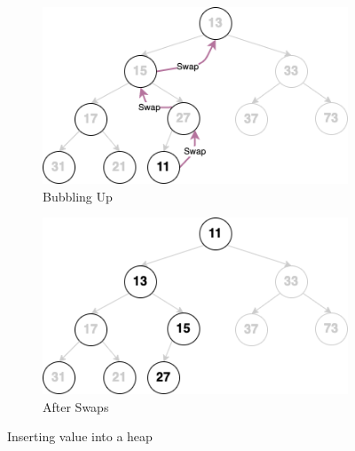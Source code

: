\begin{figure}[h!]
	\centering
	\begin{subfigure}[b]{0.45\textwidth}
		\includegraphics[width=\textwidth]{images/binary_heap_insert.png}
		\caption{Bubbling Up}
		\label{fig:heapinsert}
	\end{subfigure}
	\begin{subfigure}[b]{0.45\textwidth}
		\includegraphics[width=\textwidth]{images/binary_heap_insert_2.png}
		\caption{After Swaps}
		\label{fig:heapresult}
	\end{subfigure}
	\caption{Inserting value into a heap}\label{fig:heapstuff1}
\end{figure}


